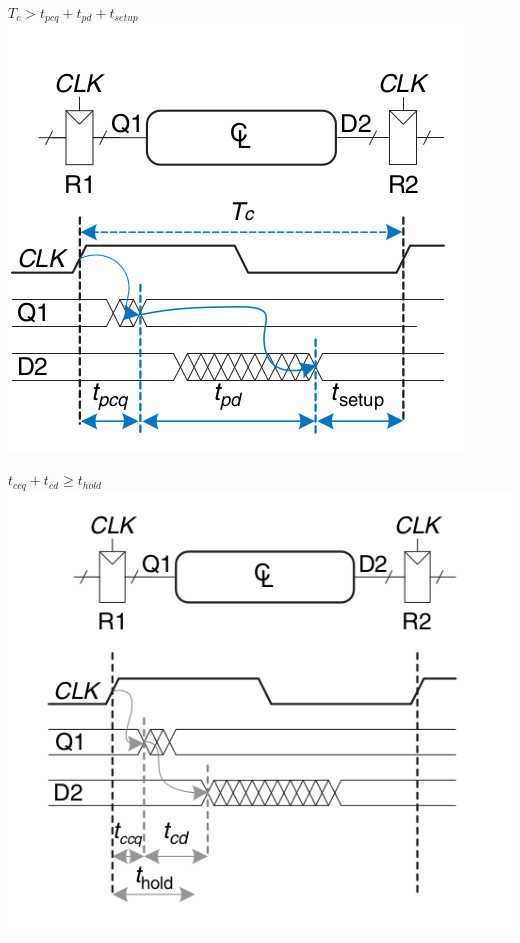 \begin{definition}
  $T_c > t_{pcq} + t_{pd} + t_{setup}$\\
\includegraphics[width=0.8\linewidth]{./media/fig3.39.png}
\end{definition}

\begin{definition}
  $t_{ccq} + t_{cd} \ge t_{hold}$\\
\includegraphics[width=0.8\linewidth]{./media/fig3.40.png}
\end{definition}

